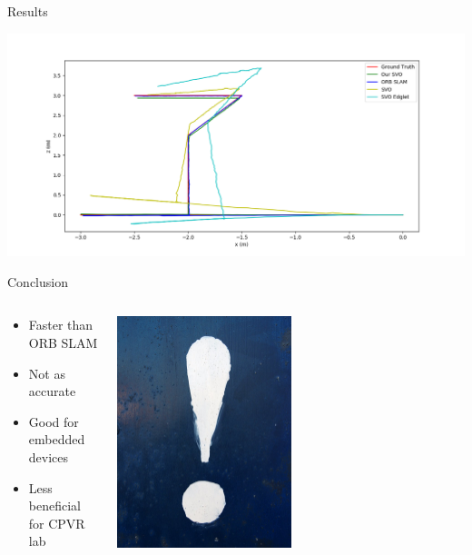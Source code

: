 \documentclass[aspectratio=169]{beamer}
\begin{document}
\begin{frame}{Results}
  \begin{center}
    \includegraphics[height=0.9\textheight]{../img/blender_classroom_simple_comp_top.png}
  \end{center}
\end{frame}

\begin{frame}{Conclusion}
  \begin{columns}[c]
    \begin{column}{0.4\linewidth}
      \begin{itemize}
        \item Faster than ORB SLAM
        \item Not as accurate
        \item Good for embedded devices
        \item Less beneficial for CPVR lab
      \end{itemize}
    \end{column}
    \begin{column}{0.4\linewidth}
      \begin{center}
        \includegraphics[width=0.5\textwidth]{./img/exclamationmark.jpg}
      \end{center}
    \end{column}
  \end{columns}
\end{frame}
\end{document}
